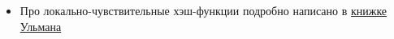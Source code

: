 \begin{itemize}

\item Про локально-чувствительные хэш-функции подробно написано в \href{http://infolab.stanford.edu/~ullman/mmds/book.pdf}{книжке Ульмана}
  
\end{itemize}


\clearpage
